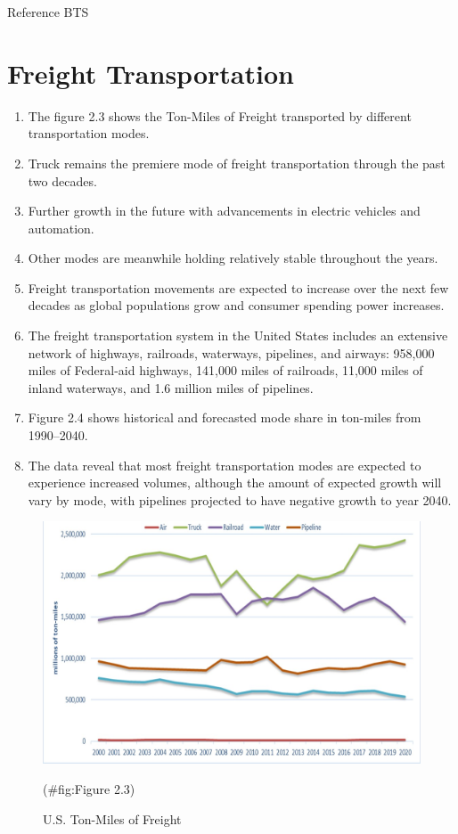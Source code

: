 \documentclass[
]{book}
\begin{document}
Reference BTS

\hypertarget{intro-Freight}{%
\section{Freight Transportation}\label{intro-Freight}}

\begin{enumerate}
\def\labelenumi{\arabic{enumi})}
\item
  The figure 2.3 shows the Ton-Miles of Freight transported by different transportation modes.
\item
  Truck remains the premiere mode of freight transportation through the past two decades.
\item
  Further growth in the future with advancements in electric vehicles and automation.
\item
  Other modes are meanwhile holding relatively stable throughout the years.
\item
  Freight transportation movements are expected to increase over the next few decades as global populations grow and consumer spending power increases.
\item
  The freight transportation system in the United States includes an extensive network of highways, railroads, waterways, pipelines, and airways: 958,000 miles of Federal-aid highways, 141,000 miles of railroads, 11,000 miles of inland waterways, and 1.6 million miles of pipelines.
\item
  Figure 2.4 shows historical and forecasted mode share in ton-miles from 1990--2040.
\item
  The data reveal that most freight transportation modes are expected to experience increased volumes, although the amount of expected growth will vary by mode, with pipelines projected to have negative growth to year 2040.
\end{enumerate}

\begin{figure}

{\centering \includegraphics{./Images/Intro/U.S. Ton-Miles of Freight} 

}

\caption{U.S. Ton-Miles of Freight}(\#fig:Figure 2.3)
\end{figure}
\end{document}
